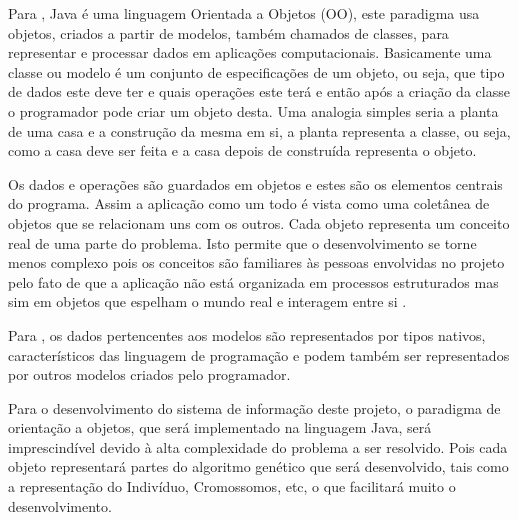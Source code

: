 \par Para , Java é
uma linguagem Orientada a Objetos (OO), este paradigma usa objetos, criados a
partir de modelos, também chamados de classes, para representar e processar
dados em aplicações computacionais. Basicamente uma classe ou modelo é um
conjunto de especificações de um objeto, ou seja, que tipo de dados este deve
ter e quais operações este terá e então após a criação da classe o programador
pode criar um objeto desta. Uma analogia simples seria a planta de uma casa e a
construção da mesma em si, a planta representa a classe, ou seja, como a casa deve ser feita e a casa depois de construída representa o objeto.

\par Os dados e operações são guardados em objetos e estes são os elementos
centrais do programa. Assim a aplicação como um todo é vista como uma coletânea
de objetos que se relacionam uns com os outros. Cada objeto representa um conceito real de uma parte do problema. 
Isto permite que o desenvolvimento se torne menos complexo pois os conceitos são familiares
às pessoas envolvidas no projeto pelo fato de que a aplicação não está
organizada em processos estruturados mas sim em objetos que espelham o mundo real e interagem entre si  \cite{teste_doutorado_manzoni}.

\par Para , 
os dados pertencentes aos modelos são representados por tipos nativos,
característicos das linguagem de programação e podem também ser representados
por outros modelos criados pelo programador.


\par Para o desenvolvimento do sistema de informação deste projeto, o paradigma
de orientação a objetos, que será implementado na linguagem Java, será
imprescindível devido à alta complexidade do problema a ser resolvido. Pois cada objeto representará partes do algoritmo genético que será desenvolvido, tais
como a representação do Indivíduo, Cromossomos, etc, o que facilitará muito o
desenvolvimento.

